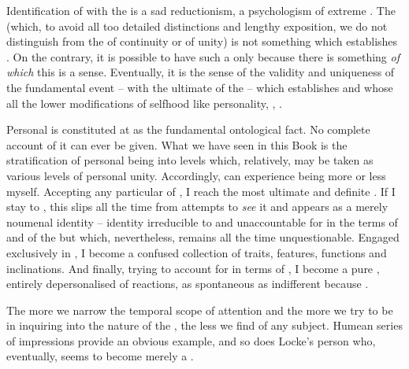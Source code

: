 Identification of  with the  is a sad reductionism,
a psychologism of extreme .  The  (which, to
avoid all too detailed distinctions and lengthy exposition, we do not
distinguish from the  of continuity or of unity) is not something
which establishes .  On the contrary, it is possible to have such a
 only because there is something {\em of which} this is a sense.
Eventually, it is the sense of the  validity and uniqueness of the
fundamental event --  with the ultimate  of
the  -- which establishes  and whose 
all the lower modifications of selfhood like personality, ,
.


\pa Personal  is constituted at  as the fundamental
ontological fact.  No complete  account of it can ever be given.
What we have seen in this Book is the stratification of personal being into
levels which, relatively, may be taken as various levels of personal unity.
Accordingly,  can experience being more or less {myself}.  Accepting
  any particular  of , {I} reach
the most ultimate and definite .  If {I} stay  to
, this  slips all the time from  attempts
to {\em see} it and appears as a merely noumenal identity -- identity
irreducible to and unaccountable for in the  terms of 
and of the  but which, nevertheless, remains all the time
unquestionable.  Engaged exclusively in , {I} become a confused
collection of traits, features, functions and inclinations.  And finally, trying
to account for  in terms of , {I} become a pure
, entirely depersonalised  of  reactions, as
spontaneous as indifferent because .

\pa The more we narrow the temporal scope of attention and the more
 we try to be in inquiring into the nature of the ,
the less we find of any subject.  Humean series of impressions provide
an obvious example, and so does Locke's person who, eventually, seems to become
merely a .

